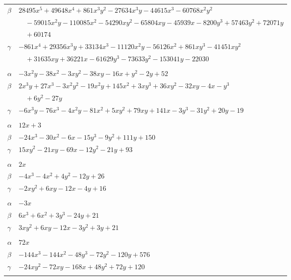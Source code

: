 \documentclass[11pt]{article}
\begin{document}
\begin{longtable}{@{}ll@{}}
$\beta$ & $28495x^{5}+49648x^{4}+861x^{3}y^{2}-27634x^{3}y-44615x^{3}-60768x^{2}y^{2}$\\
 & $\quad -59015x^{2}y-110085x^{2}-54290xy^{2}-65804xy-45939x-8200y^{3}+57463y^{2}+72071y$\\
 & $\quad +60174$\\
$\gamma$ & $-861x^{4}+29356x^{3}y+33134x^{3}-11120x^{2}y-56126x^{2}+861xy^{3}-41451xy^{2}$\\
 & $\quad +31635xy+36221x-61629y^{3}-73633y^{2}-153041y-22030$\\
\addlinespace[3pt]
\multicolumn{2}{@{}l}{$\{i,j\}=\{43,181\}$, $k_{ij}=2^{2}\cdot 3\cdot 13$}\\
$\alpha$ & $-3x^{2}y-38x^{2}-3xy^{2}-38xy-16x+y^{2}-2y+52$\\
$\beta$ & $2x^{3}y+27x^{3}-3x^{2}y^{2}-19x^{2}y+145x^{2}+3xy^{3}+36xy^{2}-32xy-4x-y^{3}$\\
 & $\quad +6y^{2}-27y$\\
$\gamma$ & $-6x^{3}y-76x^{3}-4x^{2}y-81x^{2}+5xy^{2}+79xy+141x-3y^{3}-31y^{2}+20y-19$\\
\addlinespace[3pt]
\multicolumn{2}{@{}l}{$\{i,j\}=\{44,47\}$, $k_{ij}=2^{2}\cdot 3^{2}\cdot 7$}\\
$\alpha$ & $12x+3$\\
$\beta$ & $-24x^{3}-30x^{2}-6x-15y^{3}-9y^{2}+111y+150$\\
$\gamma$ & $15xy^{2}-21xy-69x-12y^{2}-21y+93$\\
\addlinespace[3pt]
\multicolumn{2}{@{}l}{$\{i,j\}=\{44,48\}$, $k_{ij}=2\cdot 3\cdot 7$}\\
$\alpha$ & $2x$\\
$\beta$ & $-4x^{3}-4x^{2}+4y^{2}-12y+26$\\
$\gamma$ & $-2xy^{2}+6xy-12x-4y+16$\\
\addlinespace[3pt]
\multicolumn{2}{@{}l}{$\{i,j\}=\{44,49\}$, $k_{ij}=2\cdot 3\cdot 7$}\\
$\alpha$ & $-3x$\\
$\beta$ & $6x^{3}+6x^{2}+3y^{3}-24y+21$\\
$\gamma$ & $3xy^{2}+6xy-12x-3y^{2}+3y+21$\\
\addlinespace[3pt]
\multicolumn{2}{@{}l}{$\{i,j\}=\{44,50\}$, $k_{ij}=2^{6}\cdot 3^{2}$}\\
$\alpha$ & $72x$\\
$\beta$ & $-144x^{3}-144x^{2}-48y^{3}-72y^{2}-120y+576$\\
$\gamma$ & $-24xy^{2}-72xy-168x+48y^{2}+72y+120$\\
\addlinespace[3pt]

\end{longtable}
\end{document}
